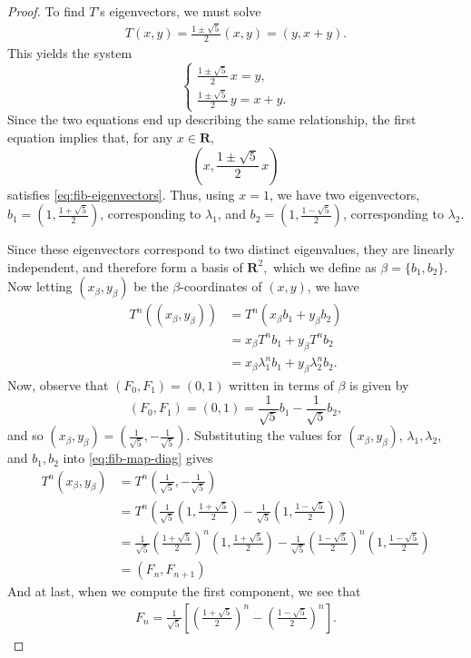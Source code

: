 \documentclass{article}
\numberwithin{equation}{section}
\begin{document}
\begin{proof}
To find $T$'s eigenvectors, we must solve
\begin{align}
\label{eq:fib-eigenvectors}
T(x,y) = \frac{1\pm\sqrt{5}}{2}(x,y) = (y,x+y).
\end{align}
This yields the system
\[
\begin{cases}
\displaystyle \frac{1\pm\sqrt{5}}{2}\,x = y, \\[6pt]
\displaystyle \frac{1\pm\sqrt{5}}{2}\,y = x + y.
\end{cases}
\]
Since the two equations end up describing the same relationship, the first equation implies that, for any $x\in \mathbf{R},$
$$(x,\frac{1\pm\sqrt{5}}{2}\,x)$$ satisfies \ref{eq:fib-eigenvectors}. Thus, using $x=1$, we have two eigenvectors,
$b_1 =(1,\frac{1+\sqrt{5}}{2})$, corresponding to $\lambda_1$, and
$b_2 = (1,\frac{1-\sqrt{5}}{2})$, corresponding to $\lambda_2.$

Since these eigenvectors correspond to two distinct eigenvalues, they are linearly independent, and therefore form a basis of $\mathbf{R}^2,$ which we define as $\beta = \{b_1,b_2\}.$ Now letting $(x_{\beta},y_{\beta})$ be the $\beta$-coordinates of $(x,y)$, we have
\begin{align}
\label{eq:fib-map-diag}
T^n((x_{\beta},y_{\beta})) &= T^n(x_{\beta}b_1 + y_{\beta}b_2) \\
                 &= x_{\beta}T^nb_1 + y_{\beta}T^nb_2 \\
                 &= x_{\beta}\lambda_1^nb_1 + y_{\beta}\lambda_2^nb_2.
\end{align}
Now, observe that $(F_0,F_1)=(0,1)$ written in terms of $\beta$ is given by
$$
    (F_0,F_1)=(0,1) = \frac{1}{\sqrt{5}}b_1 - \frac{1}{\sqrt{5}}b_2,
$$
and so $(x_{\beta},y_{\beta})=(\frac{1}{\sqrt{5}},-\frac{1}{\sqrt{5}}).$
Substituting the values for $(x_{\beta},y_{\beta})$, $\lambda_1,\lambda_2$, and $b_1,b_2$ into \ref{eq:fib-map-diag} gives
\begin{align*}
T^n(x_{\beta},y_{\beta}) &= T^n(\frac{1}{\sqrt{5}},-\frac{1}{\sqrt{5}}) \\
    &= T^n\left( \frac{1}{\sqrt{5}}(1,\frac{1+\sqrt{5}}{2}) - \frac{1}{\sqrt{5}}(1,\frac{1-\sqrt{5}}{2})\right) \\
    &= \frac{1}{\sqrt{5}}\left(\frac{1+\sqrt{5}}{2}\right)^n(1,\frac{1+\sqrt{5}}{2}) - \frac{1}{\sqrt{5}}\left(\frac{1-\sqrt{5}}{2}\right)^n(1,\frac{1-\sqrt{5}}{2}) \\
    &= (F_n, F_{n+1})
\end{align*}
And at last, when we compute the first component, we see that
\begin{align*}
F_n = \frac{1}{\sqrt{5}}\left[\left(\frac{1+\sqrt{5}}{2}\right)^n - \left(\frac{1-\sqrt{5}}{2}\right)^n\right].
\end{align*}
\end{proof}
\end{document}
